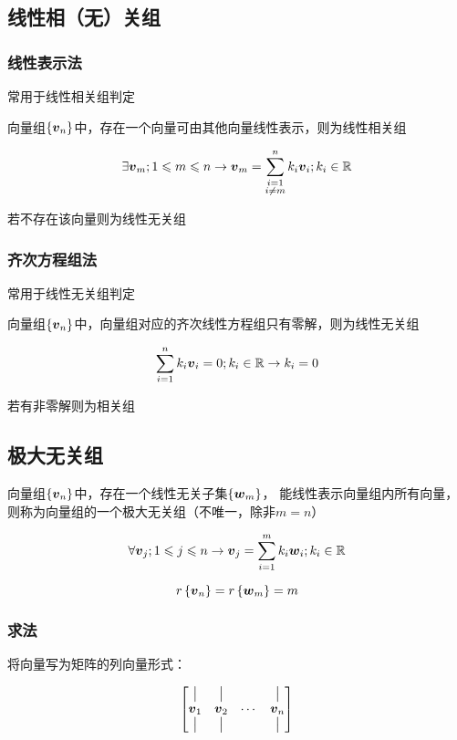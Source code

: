 \documentclass{article}
\begin{document}
\subsection{线性相（无）关组}

\subsubsection{线性表示法}

常用于线性相关组判定

向量组$\left\{\boldsymbol v_n\right\}$中，存在一个向量可由其他向量线性表示，则为线性相关组

\[\exists\boldsymbol v_m;1\leqslant m\leqslant n\to
    \boldsymbol v_m=\sum_{\substack{i=1 \\ i\neq m}}^n k_i\boldsymbol v_i;k_i\in\mathbb R\]

若不存在该向量则为线性无关组

\subsubsection{齐次方程组法}

常用于线性无关组判定

向量组$\left\{\boldsymbol v_n\right\}$中，向量组对应的齐次线性方程组只有零解，则为线性无关组

\[\sum_{i=1}^nk_i\boldsymbol v_i=0;k_i\in\mathbb R\to k_i=0\]

若有非零解则为相关组

\subsection{极大无关组}

向量组$\left\{\boldsymbol v_n\right\}$中，存在一个线性无关子集$\left\{\boldsymbol w_m\right\}$，
能线性表示向量组内所有向量，则称为向量组的一个极大无关组（不唯一，除非$m=n$）

\[\forall\boldsymbol v_j;1\leqslant j\leqslant n\to
    \boldsymbol v_j=\sum_{i=1}^m k_i\boldsymbol w_i;k_i\in\mathbb R\]

\[r\left\{\boldsymbol v_n\right\}=r\left\{\boldsymbol w_m\right\}=m\]

\subsubsection{求法}

将向量写为矩阵的列向量形式：

\[\begin{bmatrix}
        \big| & \big| &        & \big| \\
        \boldsymbol v_1  & \boldsymbol v_2  & \cdots & \boldsymbol v_n  \\
        \big| & \big| &        & \big|
    \end{bmatrix}\]
\end{document}
